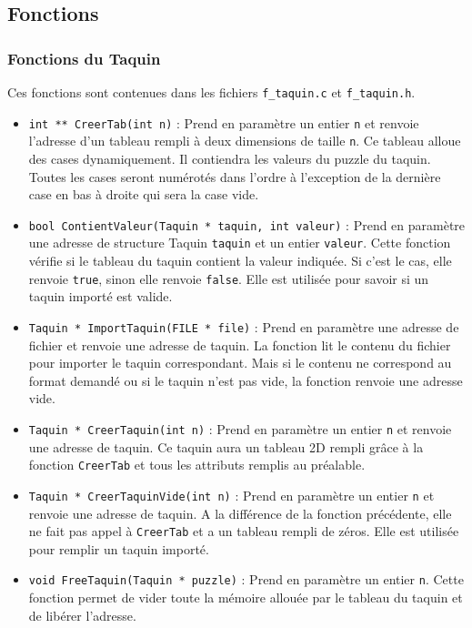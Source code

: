 \documentclass[11pt]{article}
\begin{document}
\subsection{Fonctions}
\label{sec:org6337510}

\subsubsection{Fonctions du Taquin}
\label{sec:orgb7097b7}

Ces fonctions sont contenues dans les fichiers \texttt{f\_taquin.c} et \texttt{f\_taquin.h}.

\begin{itemize}
\item \texttt{int ** CreerTab(int n)} : Prend en paramètre un entier \texttt{n} et renvoie l'adresse d'un tableau rempli à deux dimensions de taille \texttt{n}. Ce tableau alloue des cases dynamiquement. Il contiendra les valeurs du puzzle du taquin. Toutes les cases seront numérotés dans l'ordre à l'exception de la dernière case en bas à droite qui sera la case vide.
\item \texttt{bool ContientValeur(Taquin * taquin, int valeur)} : Prend en paramètre une adresse de structure Taquin \texttt{taquin} et un entier \texttt{valeur}. Cette fonction vérifie si le tableau du taquin contient la valeur indiquée. Si c'est le cas, elle renvoie \texttt{true}, sinon elle renvoie \texttt{false}. Elle est utilisée pour savoir si un taquin importé est valide.
\item \texttt{Taquin * ImportTaquin(FILE * file)} : Prend en paramètre une adresse de fichier et renvoie une adresse de taquin. La fonction lit le contenu du fichier pour importer le taquin correspondant. Mais si le contenu ne correspond au format demandé ou si le taquin n'est pas vide, la fonction renvoie une adresse vide.
\item \texttt{Taquin * CreerTaquin(int n)} : Prend en paramètre un entier \texttt{n} et renvoie une adresse de taquin. Ce taquin aura un tableau 2D rempli grâce à la fonction \texttt{CreerTab} et tous les attributs remplis au préalable.
\item \texttt{Taquin * CreerTaquinVide(int n)} : Prend en paramètre un entier \texttt{n} et renvoie une adresse de taquin. A la différence de la fonction précédente, elle ne fait pas appel à \texttt{CreerTab} et a un tableau rempli de zéros. Elle est utilisée pour remplir un taquin importé.
\item \texttt{void FreeTaquin(Taquin * puzzle)} : Prend en paramètre un entier \texttt{n}. Cette fonction permet de vider toute la mémoire allouée par le tableau du taquin et de libérer l'adresse.

\end{itemize}
\end{document}
